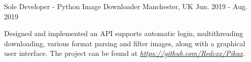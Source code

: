 \begin{cventries}
  
  


  \cventry
    {Sole Developer - Python} %
    {Image Downloader} %
    {Manchester, UK} %
    {Jun. 2019 - Aug. 2019} %
    {
      \begin{cvitems} %
        \item {Designed and implemented an API supports automatic login, multithreading downloading, various format parsing and filter images, along with a graphical user interface. The project can be found at \href{https://github.com/Redcxx/Pikax}{\textit{https://github.com/Redcxx/Pikax}}.}
      \end{cvitems}
    }
  

\end{cventries}
